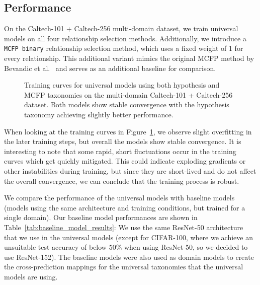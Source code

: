 \subsection{Performance}

On the Caltech-101 + Caltech-256 multi-domain dataset,
we train universal models on all four relationship selection methods.
Additionally, we introduce a \texttt{MCFP binary} relationship selection method,
which uses a fixed weight of 1 for every relationship.
This additional variant mimics the original MCFP method by Bevandic et al.~\cite{bevandic_automatic_2022}
and serves as an additional baseline for comparison.

\begin{figure}[H]
      \centering
      \resizebox{0.6\textwidth}{!}{}
      \caption{Training curves for universal models using both hypothesis and MCFP taxonomies on the multi-domain Caltech-101 + Caltech-256 dataset. Both models show stable convergence with the hypothesis taxonomy achieving slightly better performance.}
      \label{fig:universal_model_training_curves}
\end{figure}

When looking at the training curves in Figure~\ref{fig:universal_model_training_curves},
we observe slight overfitting in the later training steps,
but overall the models show stable convergence.
It is interesting to note that some rapid, short fluctuations occur in the training curves
which get quickly mitigated.
This could indicate exploding gradients or other instabilities during training,
but since they are short-lived and do not affect the overall convergence,
we can conclude that the training process is robust.



We compare the performance of the universal models with baseline models
(models using the same architecture and training conditions, but trained for a single domain).
Our baseline model performances are shown in Table~\ref{tab:baseline_model_results}:
We use the same ResNet-50 architecture that we use in the universal models
(except for CIFAR-100, where we achieve an unsuitable test accuracy of below $50\%$ when using ResNet-50,
so we decided to use ResNet-152).
The baseline models were also used as domain models to create the cross-prediction mappings
for the universal taxonomies that the universal models are using.




